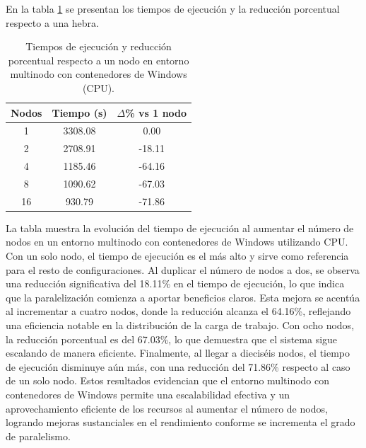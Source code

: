 En la tabla \ref{tab:multi-node_windows_\textit{Docker}} se presentan los tiempos de ejecución y la reducción porcentual respecto a una hebra.

\begin{table}[ht]
    \centering
    \begin{tabular}{|c|c|c|}
        \hline
        \textbf{Nodos} & \textbf{Tiempo (s)} & \textbf{$\Delta$\% vs 1 nodo} \\
        \hline
        1              & 3308.08             & 0.00                          \\
        2              & 2708.91             & -18.11                        \\
        4              & 1185.46             & -64.16                        \\
        8              & 1090.62             & -67.03                        \\
        16             & 930.79              & -71.86                        \\
        \hline
    \end{tabular}
    \caption{Tiempos de ejecución y reducción porcentual respecto a un nodo en entorno multinodo con contenedores de Windows (CPU).}
    \label{tab:multi-node_windows_\textit{Docker}}
\end{table}

La tabla muestra la evolución del tiempo de ejecución al aumentar el número de nodos en un entorno multinodo con contenedores de Windows utilizando CPU. Con un solo nodo, el tiempo de ejecución es el más alto y sirve como referencia para el resto de configuraciones. Al duplicar el número de nodos a dos, se observa una reducción significativa del 18.11\% en el tiempo de ejecución, lo que indica que la paralelización comienza a aportar beneficios claros. Esta mejora se acentúa al incrementar a cuatro nodos, donde la reducción alcanza el 64.16\%, reflejando una eficiencia notable en la distribución de la carga de trabajo. Con ocho nodos, la reducción porcentual es del 67.03\%, lo que demuestra que el sistema sigue escalando de manera eficiente. Finalmente, al llegar a dieciséis nodos, el tiempo de ejecución disminuye aún más, con una reducción del 71.86\% respecto al caso de un solo nodo. Estos resultados evidencian que el entorno multinodo con contenedores de Windows permite una escalabilidad efectiva y un aprovechamiento eficiente de los recursos al aumentar el número de nodos, logrando mejoras sustanciales en el rendimiento conforme se incrementa el grado de paralelismo.

